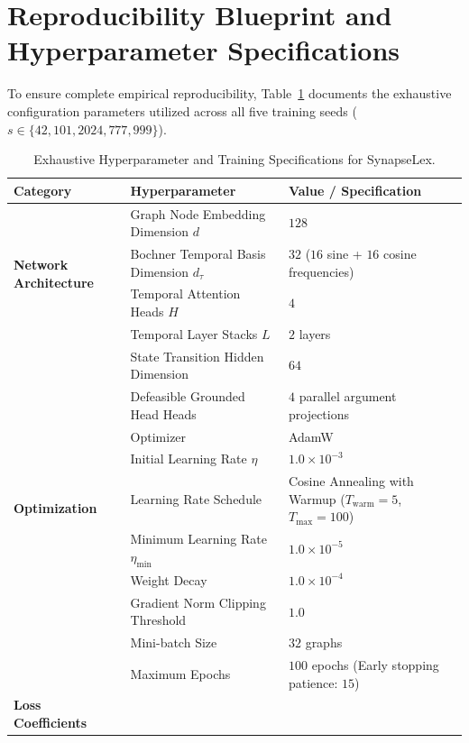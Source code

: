 \documentclass[11pt,a4paper]{article}
\begin{document}
\section{Reproducibility Blueprint and Hyperparameter Specifications}
\label{sec:appendix_hyperparameters}

To ensure complete empirical reproducibility, Table~\ref{tab:hyperparameters} documents the exhaustive configuration parameters utilized across all five training seeds ($s \in \{42, 101, 2024, 777, 999\}$).

\begin{table}[!ht]
\centering
\caption{Exhaustive Hyperparameter and Training Specifications for SynapseLex.}
\label{tab:hyperparameters}
\footnotesize
\renewcommand{\arraystretch}{0.88}
\begin{tabularx}{\textwidth}{@{}l p{5.2cm} X@{}}
\toprule
\textbf{Category} & \textbf{Hyperparameter} & \textbf{Value / Specification} \\
\midrule
\multirow{4}{*}{\textbf{Network Architecture}} 
& Graph Node Embedding Dimension $d$ & $128$ \\
& Bochner Temporal Basis Dimension $d_{\tau}$ & $32$ ($16$ sine + $16$ cosine frequencies) \\
& Temporal Attention Heads $H$ & $4$ \\
& Temporal Layer Stacks $L$ & $2$ layers \\
& State Transition Hidden Dimension & $64$ \\
& Defeasible Grounded Head Heads & $4$ parallel argument projections \\
\midrule
\multirow{5}{*}{\textbf{Optimization}}
& Optimizer & AdamW \citep{loshchilov2017decoupled} \\
& Initial Learning Rate $\eta$ & $1.0 \times 10^{-3}$ \\
& Learning Rate Schedule & Cosine Annealing with Warmup ($T_{\mathrm{warm}}=5$, $T_{\max}=100$) \\
& Minimum Learning Rate $\eta_{\min}$ & $1.0 \times 10^{-5}$ \\
& Weight Decay & $1.0 \times 10^{-4}$ \\
& Gradient Norm Clipping Threshold & $1.0$ \\
& Mini-batch Size & $32$ graphs \\
& Maximum Epochs & $100$ epochs (Early stopping patience: $15$) \\
\midrule
\multirow{3}{*}{\textbf{Loss Coefficients}}

\end{tabularx}
\end{table}
\end{document}
